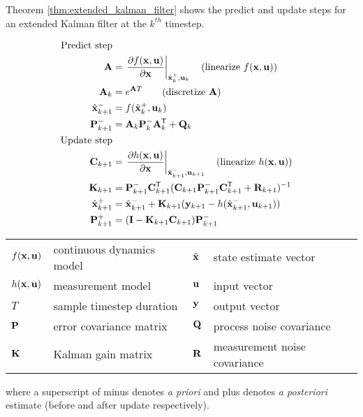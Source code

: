 Theorem \ref{thm:extended_kalman_filter} shows the predict and update steps for
an extended Kalman filter at the $k^{th}$ timestep.
\begin{theorem}
  \label{thm:extended_kalman_filter}
  \begin{align}
    \text{Predict step} \nonumber \\
    \mathbf{A} &= \left.\frac{\partial f(\mathbf{x}, \mathbf{u})}{\partial \mathbf{x}}
               \right|_{\hat{\mathbf{x}}_k^+, \mathbf{u}_k}
      \quad\text{(linearize $f(\mathbf{x}, \mathbf{u})$)} \\
    \mathbf{A}_k &= e^{\mathbf{A}T} \qquad\text{(discretize $\mathbf{A}$)} \\
    \hat{\mathbf{x}}_{k+1}^- &= f(\hat{\mathbf{x}}_k^+, \mathbf{u}_k) \\
    \mathbf{P}_{k+1}^- &= \mathbf{A}_k \mathbf{P}_k^- \mathbf{A}_k^\mathsf{T} + \mathbf{Q}_k \\
    \text{Update step} \nonumber \\
    \mathbf{C}_{k+1} &= \left.\frac{\partial h(\mathbf{x}, \mathbf{u})}{\partial \mathbf{x}}
                     \right|_{\hat{\mathbf{x}}_{k+1}^-, \mathbf{u}_{k+1}}
      \quad\text{(linearize $h(\mathbf{x}, \mathbf{u})$)} \\
    \mathbf{K}_{k+1} &= \mathbf{P}_{k+1}^- \mathbf{C}_{k+1}^\mathsf{T}
      (\mathbf{C}_{k+1}\mathbf{P}_{k+1}^- \mathbf{C}_{k+1}^\mathsf{T} + \mathbf{R}_{k+1})^{-1} \\
    \hat{\mathbf{x}}_{k+1}^+ &=
      \hat{\mathbf{x}}_{k+1}^- + \mathbf{K}_{k+1}(\mathbf{y}_{k+1} -
      h(\hat{\mathbf{x}}_{k+1}^-, \mathbf{u}_{k+1})) \\
    \mathbf{P}_{k+1}^+ &= (\mathbf{I} - \mathbf{K}_{k+1}\mathbf{C}_{k+1})\mathbf{P}_{k+1}^-
  \end{align}
  \begin{figurekey}
    \begin{tabular}{llll}
      $f(\mathbf{x}, \mathbf{u})$ & continuous dynamics model & $\hat{\mathbf{x}}$ & state estimate vector \\
      $h(\mathbf{x}, \mathbf{u})$ & measurement model & $\mathbf{u}$ & input vector \\
      $T$ & sample timestep duration & $\mathbf{y}$ & output vector \\
      $\mathbf{P}$ & error covariance matrix & $\mathbf{Q}$ & process noise covariance \\
      $\mathbf{K}$ & Kalman gain matrix & $\mathbf{R}$ & measurement noise covariance \\
    \end{tabular}
  \end{figurekey}

  where a superscript of minus denotes \textit{a priori} and plus denotes
  \textit{a posteriori} estimate (before and after update respectively).
\end{theorem}
